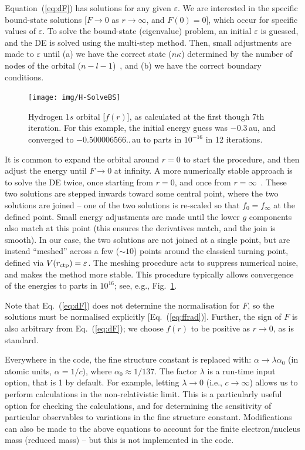 \documentclass[10pt,twocolumn,a4paper]{article}%
\def\en{\ensuremath{\varepsilon}}
\renewcommand{\k}{\ensuremath{\kappa}}
\begin{document}
Equation~(\ref{eq:dF}) has solutions for any given $\en$. 
We are interested in the specific bound-state solutions [$F\to0$ as $r\to\infty$, and $F(0)=0$], which occur for specific values of $\en$.
To solve the bound-state (eigenvalue) problem, an initial $\en$ is guessed, and the DE is solved using the multi-step method.
Then, small adjustments are made to $\en$ until (a) we have the correct state ($n\k$) determined by the number of nodes of the orbital ($n-l-1$)~\cite{BetheBook}, and (b) we have the correct boundary conditions.

\begin{figure}
\centering
\texttt{[image: img/H-SolveBS]}
\caption{\small Hydrogen $1s$ orbital [$f(r)$], as calculated at the first though 7th iteration. 
For this example, the initial energy guess was $-0.3$\,au, and converged to $-0.500006566..$\,au to parts in $10^{-16}$ in 12 iterations.\label{fig:H-SolveBS}}
\end{figure}



It is common to expand the orbital around $r=0$ to start the procedure, and then adjust the energy until $F\to0$ at infinity.
%
A more numerically stable approach is to solve the DE twice, once starting from $r=0$, and once from $r=\infty$~\cite{JohnsonBook2007}.
These two solutions are stepped inwards toward some central point, where the two solutions are joined -- one of the two solutions is re-scaled so that $f_0=f_\infty$ at the defined point.
Small energy adjustments are made until the lower $g$ components also match at this point (this ensures the derivatives match, and the join is smooth).
In our case, the two solutions are not joined at a single point, but are instead ``meshed'' across a few ($\sim10$)  points around the classical turning point, defined via $V(r_{\rm ctp}) = \en$.
The meshing procedure acts to suppress numerical noise, and makes the method more stable.
This procedure typically allows convergence of the energies to parts in $10^{16}$;
see, e.g., Fig.~\ref{fig:H-SolveBS}.






Note that Eq.~(\ref{eq:dF}) does not determine the normalisation for $F$, so the solutions must be normalised explicitly [Eq.~(\ref{eq:ffrad})].
Further, the sign of $F$ is also arbitrary from Eq.~(\ref{eq:dF}); we choose $f(r)$ to be positive as $r\to 0$, as is standard.


Everywhere in the code, the fine structure constant is replaced with: $\alpha\to\lambda \alpha_0$ (in atomic units, $\alpha=1/c$), where $\alpha_0\approx1/137$.
The factor $\lambda$ is a run-time input option, that is 1 by default. 
For example, letting $\lambda\to0$ (i.e., $c\to\infty$) allows us to perform calculations in the non-relativistic limit.
This is a particularly useful option for checking the calculations, and for determining the sensitivity of particular observables to variations in the fine structure constant.
Modifications can also be made to the above equations to account for the finite electron/nucleus mass (reduced mass) -- but this is not implemented in the code.
\end{document}
